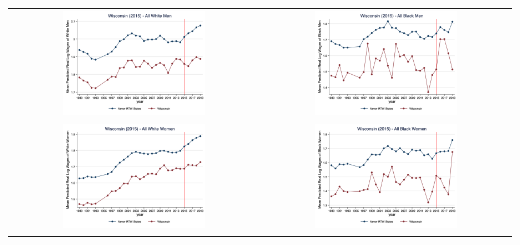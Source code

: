 \documentclass[11pt]{article}
\begin{document}
{\pagebreak
\begin{landscape}
\begin{table}[h!]
    \centering
    \label{fig:pta_wi}
    \begin{tabular}{c c}
          \includegraphics[width = 0.6\textwidth, keepaspectratio]{figures/pta/fin_wm_wi.png} & \includegraphics[width = 0.6\textwidth, keepaspectratio]{figures/pta/fin_bm_wi.png} \\
          \includegraphics[width = 0.6\textwidth, keepaspectratio]{figures/pta/fin_wf_wi.png} & \includegraphics[width = 0.6\textwidth, keepaspectratio]{figures/pta/fin_bf_wi.png}
    \end{tabular}
\end{table}
\end{landscape}

}
\end{document}
